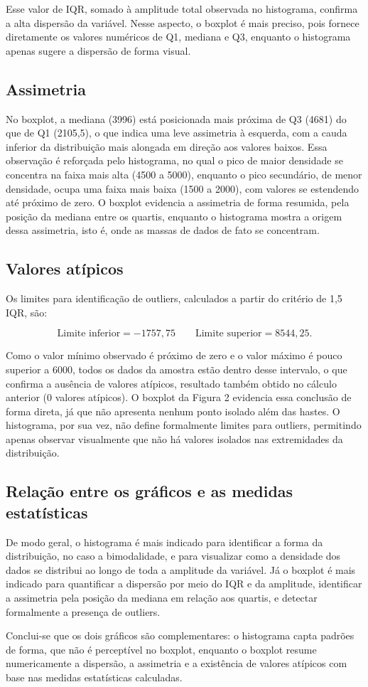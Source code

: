 \documentclass[12pt,a4paper]{article}
\begin{document}
Esse valor de IQR, somado à amplitude total observada no histograma, confirma a alta dispersão da variável. Nesse aspecto, o boxplot é mais preciso, pois fornece diretamente os valores numéricos de Q1, mediana e Q3, enquanto o histograma apenas sugere a dispersão de forma visual.

\subsection*{Assimetria}

No boxplot, a mediana (3996) está posicionada mais próxima de Q3 (4681) do que de Q1 (2105,5), o que indica uma leve assimetria à esquerda, com a cauda inferior da distribuição mais alongada em direção aos valores baixos. Essa observação é reforçada pelo histograma, no qual o pico de maior densidade se concentra na faixa mais alta (4500 a 5000), enquanto o pico secundário, de menor densidade, ocupa uma faixa mais baixa (1500 a 2000), com valores se estendendo até próximo de zero. O boxplot evidencia a assimetria de forma resumida, pela posição da mediana entre os quartis, enquanto o histograma mostra a origem dessa assimetria, isto é, onde as massas de dados de fato se concentram.

\subsection*{Valores atípicos}

Os limites para identificação de outliers, calculados a partir do critério de 1,5 IQR, são:

\[
\text{Limite inferior} = -1757{,}75 \qquad \text{Limite superior} = 8544{,}25.
\]

Como o valor mínimo observado é próximo de zero e o valor máximo é pouco superior a 6000, todos os dados da amostra estão dentro desse intervalo, o que confirma a ausência de valores atípicos, resultado também obtido no cálculo anterior (0 valores atípicos). O boxplot da Figura 2 evidencia essa conclusão de forma direta, já que não apresenta nenhum ponto isolado além das hastes. O histograma, por sua vez, não define formalmente limites para outliers, permitindo apenas observar visualmente que não há valores isolados nas extremidades da distribuição.

\subsection*{Relação entre os gráficos e as medidas estatísticas}

De modo geral, o histograma é mais indicado para identificar a forma da distribuição, no caso a bimodalidade, e para visualizar como a densidade dos dados se distribui ao longo de toda a amplitude da variável. Já o boxplot é mais indicado para quantificar a dispersão por meio do IQR e da amplitude, identificar a assimetria pela posição da mediana em relação aos quartis, e detectar formalmente a presença de outliers.

Conclui-se que os dois gráficos são complementares: o histograma capta padrões de forma, que não é perceptível no boxplot, enquanto o boxplot resume numericamente a dispersão, a assimetria e a existência de valores atípicos com base nas medidas estatísticas calculadas.
\end{document}
